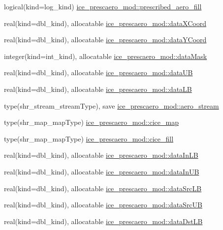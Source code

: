 \begin{DoxyCompactItemize}
\item 
logical(kind=log\_\-kind) \hyperlink{namespaceice__prescaero__mod_aa57981b6da9b30b28d73604e3a8b9851}{ice\_\-prescaero\_\-mod::prescribed\_\-aero\_\-fill}
\item 
real(kind=dbl\_\-kind), allocatable \hyperlink{namespaceice__prescaero__mod_aec4bdb0ed27915f50239245791a64619}{ice\_\-prescaero\_\-mod::dataXCoord}
\item 
real(kind=dbl\_\-kind), allocatable \hyperlink{namespaceice__prescaero__mod_a7ebbdee8a01449422409a6d584c84806}{ice\_\-prescaero\_\-mod::dataYCoord}
\item 
integer(kind=int\_\-kind), allocatable \hyperlink{namespaceice__prescaero__mod_ab34b112295019ba547110ff459523bd4}{ice\_\-prescaero\_\-mod::dataMask}
\item 
real(kind=dbl\_\-kind), allocatable \hyperlink{namespaceice__prescaero__mod_a5dc80d6924fb5d7281e3ed6a94055e43}{ice\_\-prescaero\_\-mod::dataUB}
\item 
real(kind=dbl\_\-kind), allocatable \hyperlink{namespaceice__prescaero__mod_adb7c17b56a47e03225f2fe34bee46d47}{ice\_\-prescaero\_\-mod::dataLB}
\item 
type(shr\_\-stream\_\-streamType), save \hyperlink{namespaceice__prescaero__mod_acec6a7f28171dd632bbd24ad76884414}{ice\_\-prescaero\_\-mod::aero\_\-stream}
\item 
type(shr\_\-map\_\-mapType) \hyperlink{namespaceice__prescaero__mod_a4975c089616e76a62c08619dc3e4fd8a}{ice\_\-prescaero\_\-mod::cice\_\-map}
\item 
type(shr\_\-map\_\-mapType) \hyperlink{namespaceice__prescaero__mod_a24d44223461a3f3c815c1c8ef882947f}{ice\_\-prescaero\_\-mod::cice\_\-fill}
\item 
real(kind=dbl\_\-kind), allocatable \hyperlink{namespaceice__prescaero__mod_a7ef634010a6c0d07c52a41321fce88d6}{ice\_\-prescaero\_\-mod::dataInLB}
\item 
real(kind=dbl\_\-kind), allocatable \hyperlink{namespaceice__prescaero__mod_a0f7120047c00901e14be1cb218202430}{ice\_\-prescaero\_\-mod::dataInUB}
\item 
real(kind=dbl\_\-kind), allocatable \hyperlink{namespaceice__prescaero__mod_afbd1563a75a090ddd309cc987ea8e9e5}{ice\_\-prescaero\_\-mod::dataSrcLB}
\item 
real(kind=dbl\_\-kind), allocatable \hyperlink{namespaceice__prescaero__mod_ad4ef44bba9c163d1a0cdd1f739878aff}{ice\_\-prescaero\_\-mod::dataSrcUB}
\item 
real(kind=dbl\_\-kind), allocatable \hyperlink{namespaceice__prescaero__mod_a7b35ab67e4a9bc5affef31d7a418c8cc}{ice\_\-prescaero\_\-mod::dataDstLB}

\end{DoxyCompactItemize}
